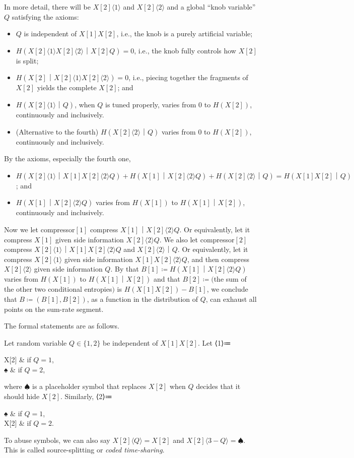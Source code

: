 \documentclass[openany]{amsbook}
\numberwithin{equation}{chapter}
\numberwithin{figure}{chapter}
\numberwithin{table}{chapter}
\def\cas#1{\begin{cases*}#1\end{cases*}}
\def\[#1\]{\begin{equation*}{#1}\end{equation*}}
\theoremstyle{definition}	理dfn:Definition~?s			理exa:Example~?s
\theoremstyle{remark}		理cla:Claim~?s				理rem:Remark~?s
\begin{document}
	In more detail, there will be $X[2]⟨1⟩$ and $X[2]⟨2⟩$ and
	a global “knob variable” $Q$ satisfying the axioms:
	\begin{itemize}
		\item	$Q$ is independent of $X[1]X[2]$, i.e.,
				the knob is a purely artificial variable;
		\item	$H(X[2]⟨1⟩X[2]⟨2⟩｜X[2]Q)=0$, i.e.,
				the knob fully controls how $X[2]$ is split;
		\item	$H(X[2]｜X[2]⟨1⟩X[2]⟨2⟩)=0$, i.e., piecing together
				the fragments of $X[2]$ yields the complete $X[2]$; and
		\item	$H(X[2]⟨1⟩｜Q)$, when $Q$ is tuned properly,
				varies from $0$ to $H(X[2])$, continuously and inclusively.
		\item	(Alternative to the fourth) $H(X[2]⟨2⟩｜Q)$
				varies from $0$ to $H(X[2])$, continuously and inclusively.
	\end{itemize}
	By the axioms, especially the fourth one,
	\begin{itemize}
		\item	$H(X[2]⟨1⟩｜X[1]X[2]⟨2⟩Q)+H(X[1]｜X[2]⟨2⟩Q)+H(X[2]⟨2⟩｜Q)
				=H(X[1]X[2]｜Q)$; and
		\item	$H(X[1]｜X[2]⟨2⟩Q)$ varies from $H(X[1])$ to $H(X[1]｜X[2])$,
				continuously and inclusively.
	\end{itemize}
	Now we let compressor$[1]$ compress $X[1]｜X[2]⟨2⟩Q$.
	Or equivalently, let it compress $X[1]$ given side information $X[2]⟨2⟩Q$.
	We also let compressor$[2]$ compress $X[2]⟨1⟩｜X[1]X[2]⟨2⟩Q$ and $X[2]⟨2⟩｜Q$.
	Or equivalently, let it compress $X[2]⟨1⟩$ given side information $X[1]X[2]⟨2⟩Q$,
	and then compress $X[2]⟨2⟩$ given side information $Q$.
	By that $B[1]≔H(X[1]｜X[2]⟨2⟩Q)$ varies from $H(X[1])$ to $H(X[1]｜X[2])$
	and that $B[2]≔($the sum of the other two conditional entropies$)$
	is $H(X[1]X[2])-B[1]$, we conclude that $B≔(B[1],B[2])$, as a function
	in the distribution of $Q$, can exhaust all points on the sum-rate segment.
	
	The formal statements are as follows.
	
	\begin{dfn}
		Let random variable $Q∈\{1,2\}$ be independent of $X[1]X[2]$.
		Let
		\[X[2]⟨1⟩≔\cas{
			X[2]	&	if $Q=1$,	\\
			♠		&	if $Q=2$,	
		}\]
		where $♠$ is a placeholder symbol that replaces $X[2]$
		when $Q$ decides that it should hide $X[2]$.
		Similarly,
		\[X[2]⟨2⟩≔\cas{
			♠		&	if $Q=1$,	\\
			X[2]	&	if $Q=2$.	
		}\]
		To abuse symbols, we can also say $X[2]⟨Q⟩=X[2]$ and $X[2]⟨3-Q⟩=♠$.
		This is called source-splitting or \emph{coded time-sharing}.
	\end{dfn}
	
\end{document}
